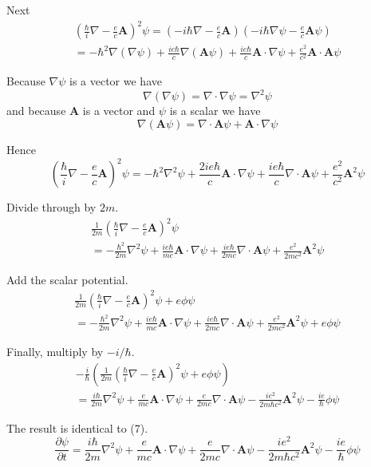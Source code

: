 \documentclass[12pt]{article}
\begin{document}
Next
\begin{multline*}
\left(\frac{\hbar}{i}\nabla-\frac{e}{c}\mathbf A\right)^2\psi
=\left(-i\hbar\nabla-\frac{e}{c}\mathbf A\right)
\left(-i\hbar\nabla\psi-\frac{e}{c}\mathbf A\psi\right)
\\
=-\hbar^2\nabla(\nabla\psi)
+\frac{ie\hbar}{c}\nabla(\mathbf A\psi)
+\frac{ie\hbar}{c}\mathbf A\cdot\nabla\psi
+\frac{e^2}{c^2}\mathbf A\cdot\mathbf A\psi
\end{multline*}

Because $\nabla\psi$ is a vector we have
\begin{equation*}
\nabla(\nabla\psi)=\nabla\cdot\nabla\psi=\nabla^2\psi
\end{equation*}
and because $\mathbf A$ is a vector and $\psi$ is a scalar we have
\begin{equation*}
\nabla(\mathbf A\psi)=\nabla\cdot\mathbf A\psi+\mathbf A\cdot\nabla\psi
\end{equation*}

Hence
\begin{equation*}
\left(\frac{\hbar}{i}\nabla-\frac{e}{c}\mathbf A\right)^2\psi
=-\hbar^2\nabla^2\psi
+\frac{2ie\hbar}{c}\mathbf A\cdot\nabla\psi
+\frac{ie\hbar}{c}\nabla\cdot\mathbf A\psi
+\frac{e^2}{c^2}\mathbf A^2\psi
\end{equation*}

Divide through by $2m$.
\begin{multline*}
\frac{1}{2m}\left(\frac{\hbar}{i}\nabla-\frac{e}{c}\mathbf A\right)^2\psi
\\
=-\frac{\hbar^2}{2m}\nabla^2\psi
+\frac{ie\hbar}{mc}\mathbf A\cdot\nabla\psi
+\frac{ie\hbar}{2mc}\nabla\cdot\mathbf A\psi
+\frac{e^2}{2mc^2}\mathbf A^2\psi
\end{multline*}

Add the scalar potential.
\begin{multline*}
\frac{1}{2m}\left(\frac{\hbar}{i}\nabla-\frac{e}{c}\mathbf A\right)^2\psi+e\phi\psi
\\
=-\frac{\hbar^2}{2m}\nabla^2\psi
+\frac{ie\hbar}{mc}\mathbf A\cdot\nabla\psi
+\frac{ie\hbar}{2mc}\nabla\cdot\mathbf A\psi
+\frac{e^2}{2mc^2}\mathbf A^2\psi
+e\phi\psi
\end{multline*}

Finally, multiply by $-i/\hbar$.
\begin{multline*}
-\frac{i}{\hbar}\left(
\frac{1}{2m}\left(\frac{\hbar}{i}\nabla-\frac{e}{c}\mathbf A\right)^2\psi+e\phi\psi
\right)
\\
=\frac{i\hbar}{2m}\nabla^2\psi
+\frac{e}{mc}\mathbf A\cdot\nabla\psi
+\frac{e}{2mc}\nabla\cdot\mathbf A\psi
-\frac{ie^2}{2m\hbar c^2}\mathbf A^2\psi
-\frac{ie}{\hbar}\phi\psi
\end{multline*}

The result is identical to (7).
\begin{equation*}
\frac{\partial\psi}{\partial t}
=\frac{i\hbar}{2m}\nabla^2\psi
+\frac{e}{mc}\mathbf A\cdot\nabla\psi
+\frac{e}{2mc}\nabla\cdot\mathbf A\psi
-\frac{ie^2}{2m\hbar c^2}\mathbf A^2\psi
-\frac{ie}{\hbar}\phi\psi
\tag{7}
\end{equation*}
\end{document}
